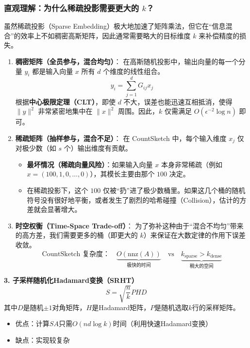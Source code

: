 \documentclass[11pt,a4paper]{ctexart}
\theoremstyle{definition}
\theoremstyle{remark}
\begin{document}
\subsubsection*{直观理解：为什么稀疏投影需要更大的 $k$？}

虽然稀疏投影（Sparse Embedding）极大地加速了矩阵乘法，但它在“信息混合”的效率上不如稠密高斯矩阵，因此通常需要略大的目标维度 $k$ 来补偿精度的损失。

\begin{enumerate}
    \item \textbf{稠密矩阵（全员参与，混合均匀）}：
    在高斯随机投影中，输出向量的每一个分量 $y_i$ 都是输入向量 $x$ 所有 $d$ 个维度的线性组合。
    \[ y_i = \sum_{j=1}^d G_{ij} x_j \]
    根据\textbf{中心极限定理（CLT）}，即使 $d$ 不大，误差也能迅速互相抵消，使得 $\|y\|^2$ 非常紧密地集中在 $\|x\|^2$ 周围。因此，$k$ 仅需满足 $O(\epsilon^{-2} \log n)$ 即可。

    \item \textbf{稀疏矩阵（抽样参与，混合不足）}：
    在 CountSketch 中，每个输入维度 $x_j$ 仅对极少数（如 $s$ 个）输出维度有贡献。
    \begin{itemize}
        \item \textbf{最坏情况（稀疏向量风险）}：如果输入向量 $x$ 本身非常稀疏（例如 $x=(100, 1, 0, \dots, 0)$），其模长主要由那个 $100$ 决定。
        \item 在稀疏投影下，这个 $100$ 仅被“扔”进了极少数桶里。如果这几个桶的随机符号没有很好地平衡，或者发生了剧烈的哈希碰撞（Collision），估计的方差就会显著增大。
    \end{itemize}
    
    \item \textbf{时空权衡（Time-Space Trade-off）}：
    为了弥补这种由于“混合不均匀”带来的高方差，我们需要更多的桶（即更大的 $k$）来保证在大数定律的作用下误差收敛。
    \[
    \text{CountSketch 复杂度：} \quad \underbrace{O(\text{nnz}(A))}_{\text{极快的时间}} \quad \text{vs} \quad \underbrace{k_{\text{sparse}} > k_{\text{dense}}}_{\text{稍大的空间}}
    \]
\end{enumerate}


\textbf{3. 子采样随机化Hadamard变换（SRHT）}
\[
S = \sqrt{\frac{n}{k}} P H D
\]
其中$D$是随机$\pm 1$对角矩阵，$H$是Hadamard矩阵，$P$是随机选取$k$行的采样矩阵。
\begin{itemize}
    \item 优点：计算$SA$只需$O(nd\log k)$时间（利用快速Hadamard变换）
    \item 缺点：实现较复杂
\end{itemize}
\end{document}
